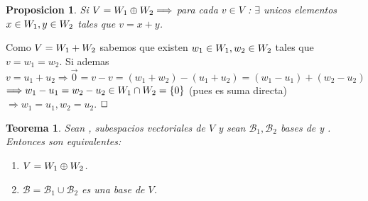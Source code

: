 \documentclass[]{article}
\newtheorem{theorem}{Teorema}
\newtheorem{proposition}{Proposicion}[theorem]
\newenvironment{proof}{\noindent{\bf Prueba:}}{$\hfill \Box$ \vspace{10pt}}
\newcommand{\ida}{\Longrightarrow}
\newcommand{\base}{\mathcal{B}}
\begin{document}
\begin{proposition}
    Si $V=\W{1} \oplus \W{2} \ida$ para cada $v\in V$ : $\exists$ unicos elementos $x \in \text{$W_{1}$} , y \in\text{$W_{2}$}$
    tales que $v=x+y$.
\end{proposition}
\begin{proof}
    Como $V=\text{$W_{1}$}+\text{$W_{2}$}$ sabemos que existen $w_1 \in \text{$W_{1}$}, w_2 \in \text{$W_{2}$}$ tales que $v=w_1=w_2$.
    Si ademas $v=u_1+u_2 \ida \vec{0}= v-v= (w_1+w_2)-(u_1+u_2)=(w_1-u_1)+(w_2-u_2)$
    $\ida w_1-u_1 = w_2-u_2 \in \W{1}\cap\W{2}= \conjunto{0}$ (pues es suma directa) $\ida w_1=u_1 , w_2=u_2$.
\end{proof}

\begin{theorem}
    Sean , subespacios vectoriales de $V$ y sean $\base_1,\base_2$ bases de  y .\\
    Entonces son equivalentes:
    \begin{enumerate}
        \item $V=\text{$W_{1}$}\oplus\text{$W_{2}$}$.
        \item $\base = \base_1 \cup \base_2$ es una base de $V$.
    \end{enumerate}
\end{theorem}
\end{document}
